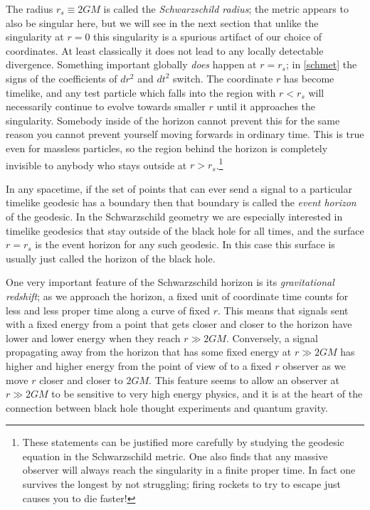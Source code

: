 \documentclass[12pt]{article}
\begin{document}
The radius $r_s\equiv2GM$ is called the \textit{Schwarzschild radius}; the metric appears to also be singular here, but we will see in the next section that unlike the singularity at $r=0$ this singularity is a spurious artifact of our choice of coordinates. At least classically it does not lead to any locally detectable divergence.  Something important globally \textit{does} happen at $r=r_s$; in \eqref{schmet} the signs of the coefficients of $dr^2$ and $dt^2$ switch.  The coordinate $r$ has become timelike, and any test particle which falls into the region with $r<r_s$ will necessarily continue to evolve towards smaller $r$ until it approaches the singularity.  Somebody inside of the horizon cannot prevent this for the same reason you cannot prevent yourself moving forwards in ordinary time.  This is true even for massless particles, so the region behind the horizon is completely invisible to anybody who stays outside at $r>r_s$.\footnote{These statements can be justified more carefully by studying the geodesic equation in the Schwarzschild metric.  One also finds that any massive observer will always reach the singularity in a finite proper time.  In fact one survives the longest by not struggling; firing rockets to try to escape just causes you to die faster!}  

In any spacetime, if the set of points that can ever send a signal to a particular timelike geodesic has a boundary then that boundary is called the \textit{event horizon} of the geodesic.  In the Schwarzschild geometry we are especially interested in timelike geodesics that stay outside of the black hole for all times, and the surface $r=r_s$ is the event horizon for any such geodesic.  In this case this surface is usually just called the horizon of the black hole.

One very important feature of the Schwarzschild horizon is its \textit{gravitational redshift}; as we approach the horizon, a fixed unit of coordinate time counts for less and less proper time along a curve of fixed $r$.  This means that signals sent with a fixed energy from a point that gets closer and closer to the horizon have lower and lower energy when they reach $r\gg 2GM$.  Conversely, a signal propagating away from the horizon that has some fixed energy at $r\gg 2GM$ has higher and higher energy from the point of view of to a fixed $r$ observer as we move $r$ closer and closer to $2GM$.  This feature seems to allow an observer at $r\gg 2GM$ to be sensitive to very high energy physics, and it is at the heart of the connection between black hole thought experiments and quantum gravity.
\end{document}
